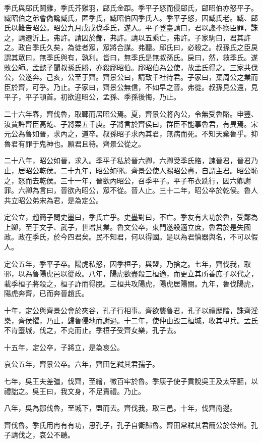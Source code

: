 季氏與郈氏鬬雞，季氏芥雞羽，郈氏金距。季平子怒而侵郈氏，郈昭伯亦怒平子。臧昭伯之弟會偽讒臧氏，匿季氏，臧昭伯囚季氏人。季平子怒，囚臧氏老。臧、郈氏以難告昭公。昭公九月戊戌伐季氏，遂入。平子登臺請曰，君以讒不察臣罪，誅之，請遷沂上。弗許。請囚於鄪，弗許。請以五乘亡，弗許。子家駒曰，君其許之。政自季氏久矣，為徒者眾，眾將合謀。弗聽。郈氏曰，必殺之。叔孫氏之臣戾謂其眾曰，無季氏與有，孰利。皆曰，無季氏是無叔孫氏。戾曰，然，救季氏。遂敗公師。孟懿子聞叔孫氏勝，亦殺郈昭伯。郈昭伯為公使，故孟氏得之。三家共伐公，公遂奔。己亥，公至于齊。齊景公曰，請致千社待君。子家曰，棄周公之業而臣於齊，可乎。乃止。子家曰，齊景公無信，不如早之晉。弗從。叔孫見公還，見平子，平子頓首。初欲迎昭公，孟孫、季孫後悔，乃止。

二十六年春，齊伐魯，取鄆而居昭公焉。夏，齊景公將內公，令無受魯賂。申豐、汝賈許齊臣高龁、子將粟五千庾。子將言於齊侯曰，群臣不能事魯君，有異焉。宋元公為魯如晉，求內之，道卒。叔孫昭子求內其君，無病而死。不知天棄魯乎。抑魯君有罪于鬼神也。願君且待。齊景公從之。

二十八年，昭公如晉，求入。季平子私於晉六卿，六卿受季氏賂，諫晉君，晉君乃止，居昭公乾侯。二十九年，昭公如鄆。齊景公使人賜昭公書，自謂主君。昭公恥之，怒而去乾侯。三十一年，晉欲內昭公，召季平子。平子布衣跣行，因六卿謝罪。六卿為言曰，晉欲內昭公，眾不從。晉人止。三十二年，昭公卒於乾侯。魯人共立昭公弟宋為君，是為定公。

定公立，趙簡子問史墨曰，季氏亡乎。史墨對曰，不亡。季友有大功於魯，受鄪為上卿，至于文子、武子，世增其業。魯文公卒，東門遂殺適立庶，魯君於是失國政。政在季氏，於今四君矣。民不知君，何以得國。是以為君慎器與名，不可以假人。

定公五年，季平子卒。陽虎私怒，囚季桓子，與盟，乃捨之。七年，齊伐我，取鄆，以為魯陽虎邑以從政。八年，陽虎欲盡殺三桓適，而更立其所善庶子以代之，載季桓子將殺之，桓子詐而得脫。三桓共攻陽虎，陽虎居陽關。九年，魯伐陽虎，陽虎奔齊，已而奔晉趙氏。

十年，定公與齊景公會於夾谷，孔子行相事。齊欲襲魯君，孔子以禮歷階，誅齊淫樂，齊侯懼，乃止，歸魯侵地而謝過。十二年，使仲由毀三桓城，收其甲兵。孟氏不肯墮城，伐之，不克而止。季桓子受齊女樂，孔子去。

十五年，定公卒，子將立，是為哀公。

哀公五年，齊景公卒。六年，齊田乞弒其君孺子。

七年，吳王夫差彊，伐齊，至繒，徵百牢於魯。季康子使子貢說吳王及太宰嚭，以禮詘之。吳王曰，我文身，不足責禮。乃止。

八年，吳為鄒伐魯，至城下，盟而去。齊伐我，取三邑。十年，伐齊南邊。

齊伐魯。季氏用冉有有功，思孔子，孔子自衛歸魯。齊田常弒其君簡公於俆州。孔子請伐之，哀公不聽。

